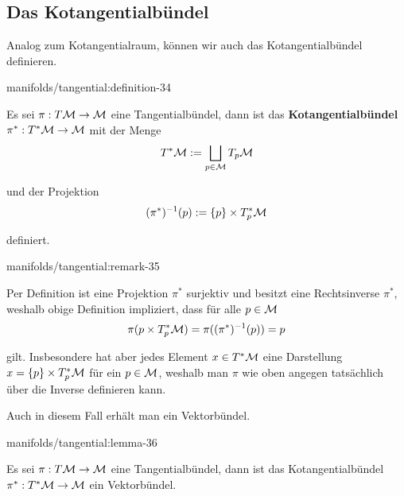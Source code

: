 \subsection{Das Kotangentialbündel}
\label{\detokenize{manifolds/tangential:das-kotangentialbundel}}\label{\detokenize{manifolds/tangential:s-kotangbundel}}
\par
Analog zum Kotangentialraum, können wir auch das Kotangentialbündel definieren.
\begin{definition}{}{manifolds/tangential:definition-34}



\par
Es sei \(\pi:T\mathcal{M}\to\mathcal{M}\) eine Tangentialbündel, dann ist das \textbf{Kotangentialbündel} \(\pi^\ast: T^\ast\mathcal{M}\to\mathcal{M}\) mit der Menge
\begin{align*}
T^\ast\mathcal{M} := \bigsqcup_{p\in\mathcal{M}} T_p\mathcal{M}
\end{align*}
\par
und der Projektion
\begin{align*}
(\pi^{\ast})^{-1}(p):= \{p\}\times T_p^\ast\mathcal{M}
\end{align*}
\par
definiert.
\end{definition}
\begin{remark}{}{manifolds/tangential:remark-35}



\par
Per Definition ist eine Projektion \(\pi^\ast\) surjektiv und besitzt eine Rechtsinverse \(\pi^\ast\), weshalb obige Definition impliziert, dass für alle \(p\in\mathcal{M}\)
\begin{align*}
\pi({p}\times T_p^\ast\mathcal{M}) = \pi((\pi^{\ast})^{-1}(p)) = p
\end{align*}
\par
gilt. Insbesondere hat aber jedes Element \(x\in T^\ast\mathcal{M}\) eine Darstellung \(x=\{p\}\times T_p^\ast\mathcal{M}\) für ein \(p\in\mathcal{M}\), weshalb man \(\pi\) wie oben angegen tatsächlich über die Inverse definieren kann.
\end{remark}

\par
Auch in diesem Fall erhält man ein Vektorbündel.
\begin{lemma}{}{manifolds/tangential:lemma-36}



\par
Es sei \(\pi:T\mathcal{M}\to\mathcal{M}\) eine Tangentialbündel, dann ist das Kotangentialbündel \(\pi^\ast:T^\ast\mathcal{M}\to\mathcal{M}\) ein Vektorbündel.
\end{lemma}


